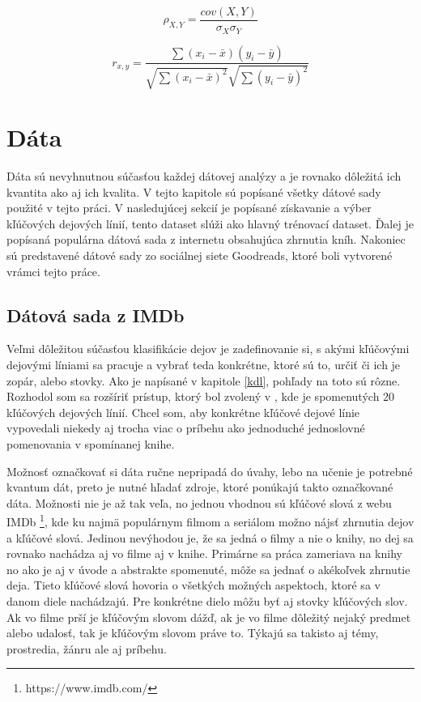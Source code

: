 \begin{equation}
	\rho_{X,Y} =  \dfrac{cov(X,Y)}{\sigma_{X} \sigma_{Y}} \label{rovnicaPearson}
\end{equation}

\begin{equation}
	r_{x,y} =  \dfrac{\sum{(x_{i}-\bar{x})(y_{i}-\bar{y})}}{\sqrt{\sum{(x_{i}-\bar{x})^2}} \sqrt{\sum{(y_{i}-\bar{y})^2}}} \label{rovnicaSpearman}
\end{equation}


\chapter{Dáta} \label{data}
Dáta sú nevyhnutnou súčasťou každej dátovej analýzy a je rovnako dôležitá ich kvantita ako aj ich kvalita. V tejto kapitole sú popísané všetky dátové sady použité v tejto práci. V nasledujúcej sekcií je popísané získavanie a výber kľúčových dejových línií, tento dataset slúži ako hlavný trénovací dataset. Ďalej je popísaná populárna dátová sada z internetu obsahujúca zhrnutia kníh. Nakoniec sú predstavené dátové sady zo sociálnej siete Goodreads, ktoré boli vytvorené vrámci tejto práce.

\section{Dátová sada z IMDb} \label{imdbdata}
Veľmi dôležitou súčasťou klasifikácie dejov je zadefinovanie si, s akými kľúčovými dejovými líniami sa pracuje a vybrať teda konkrétne, ktoré sú to, určiť či ich je zopár, alebo stovky. Ako je napísané v kapitole \ref{kdl}, pohľady na toto sú rôzne. Rozhodol som sa rozšíriť prístup, ktorý bol zvolený v \cite{Tobias:1993}, kde je spomenutých 20 kľúčových dejových línií. Chcel som, aby konkrétne kľúčové dejové línie vypovedali niekedy aj trocha viac o príbehu ako jednoduché jednoslovné pomenovania v spomínanej knihe.

Možnosť označkovať si dáta ručne nepripadá do úvahy, lebo na učenie je potrebné kvantum dát, preto je nutné hľadať zdroje, ktoré ponúkajú takto označkované dáta. Možnosti nie je až tak veľa, no jednou vhodnou sú kľúčové slová z webu IMDb \footnote{https://www.imdb.com/}, kde ku najmä populárnym filmom a seriálom možno nájsť zhrnutia dejov a kľúčové slová. Jedinou nevýhodou je, že sa jedná o filmy a nie o knihy, no dej sa rovnako nachádza aj vo filme aj v knihe. Primárne sa práca zameriava na knihy no ako je aj v úvode a abstrakte spomenuté, môže sa jednať o akékoľvek zhrnutie deja. Tieto kľúčové slová hovoria o všetkých možných aspektoch, ktoré sa v danom diele nachádzajú. Pre konkrétne dielo môžu byť aj stovky kľúčových slov. Ak vo filme prší je kľúčovým slovom dážď, ak je vo filme dôležitý nejaký predmet alebo udalosť, tak je kľúčovým slovom práve to. Týkajú sa takisto aj témy, prostredia, žánru ale aj príbehu.

